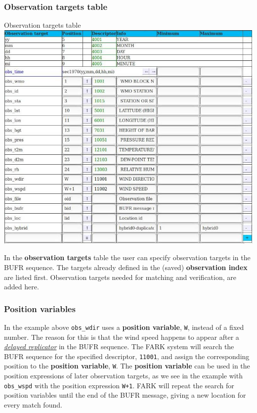 \documentclass[letterpaper,10pt,twoside,twocolumn,openany]{book}
\begin{document}
\subsubsection{Observation targets table}
\begin{paperbox}{Observation targets table}
  \includegraphics[width=\columnwidth]{coloc_obs.jpg}
\end{paperbox}
In the {\bf observation targets} table the user can specify observation targets in the BUFR sequence.
The targets already defined in the (saved) {\bf observation index} are listed first. 
Observation targets needed for matching and verification, are added here.

\subsubsection{Position variables}
In the example above \lstinline!obs_wdir! uses a {\bf position variable}, \lstinline!W!,
instead of a fixed number. 
The reason for this is that the wind speed happens to appear after a \hyperlink{delayed}{\em delayed replicator} 
in the BUFR sequence.
The FARK system will search the BUFR sequence for the specified descriptor, \lstinline!11001!,
and assign the corresponding position to the {\bf position variable},  \lstinline!W!. 
The {\bf position variable} can be used in the position expressions of later observation targets,
as we see in the example with \lstinline!obs_wspd! with the position expression \lstinline!W+1!.
FARK will repeat the search for position variables until the end of the BUFR message, giving a new location for every match found.
\end{document}
